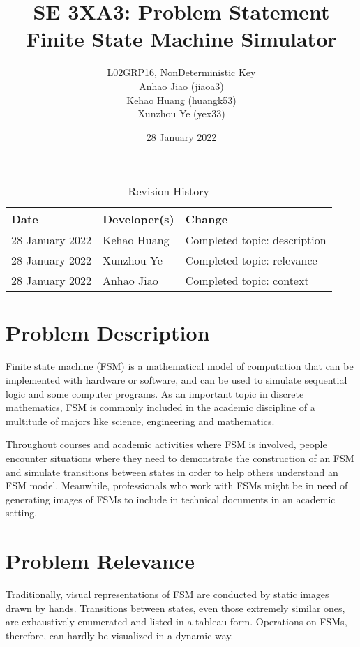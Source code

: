 \documentclass{article}
\title{SE 3XA3: Problem Statement\\Finite State Machine Simulator}
\author{L02GRP16, NonDeterministic Key
		\\ Anhao Jiao (jiaoa3)
		\\ Kehao Huang (huangk53)
		\\ Xunzhou Ye (yex33)
}
\date{28 January 2022}
\begin{document}
\begin{table}[hp]
  \caption{Revision History} \label{TblRevisionHistory}
  \begin{tabularx}{\textwidth}{llX}
    \toprule
    \textbf{Date} & \textbf{Developer(s)} & \textbf{Change}\\
    \midrule
    28 January 2022 & Kehao Huang & Completed topic: description \\
    28 January 2022 & Xunzhou Ye  & Completed topic: relevance \\
    28 January 2022 & Anhao Jiao  & Completed topic: context \\
    \bottomrule
  \end{tabularx}
\end{table}

\newpage

\maketitle

\section{Problem Description}

Finite state machine (FSM) is a mathematical model of computation that can be
implemented with hardware or software, and can be used to simulate sequential
logic and some computer programs. As an important topic in discrete mathematics,
FSM is commonly included in the academic discipline of a multitude of majors
like science, engineering and mathematics.

Throughout courses and academic activities where FSM is involved, people
encounter situations where they need to demonstrate the construction of an FSM
and simulate transitions between states in order to help others understand an
FSM model. Meanwhile, professionals who work with FSMs might be in need of
generating images of FSMs to include in technical documents in an academic
setting.

\section{Problem Relevance}

Traditionally, visual representations of FSM are conducted by static images
drawn by hands. Transitions between states, even those extremely similar ones,
are exhaustively enumerated and listed in a tableau form. Operations on FSMs,
therefore, can hardly be visualized in a dynamic way.
\end{document}
